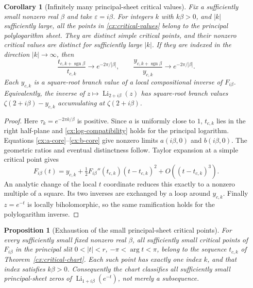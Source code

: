 \documentclass[11pt,a4paper]{article}
\numberwithin{equation}{section}
\newtheorem{proposition}[theorem]{Proposition}
\newtheorem{corollary}[theorem]{Corollary}
\theoremstyle{definition}
\theoremstyle{remark}
\DeclareMathOperator{\Li}{Li}
\begin{document}
\begin{corollary}[Infinitely many principal-sheet critical values]
\label{cx:critical-lattice}
Fix a sufficiently small nonzero real $\beta$ and take
$\varepsilon=i\beta$.  For integers $k$ with $k\beta>0$, and
$|k|$ sufficiently large, all the points in
\eqref{cx:critical-values} belong to the principal polylogarithm sheet.
They are distinct simple critical points, and their nonzero critical
values are distinct for sufficiently large $|k|$.  If they are indexed in
the direction $|k|\to\infty$, then
\begin{equation}\label{cx:geometric-ratio}
 \frac{t_{c,k+\operatorname{sgn}\beta}}{t_{c,k}}
   \longrightarrow e^{-2\pi/|\beta|},\qquad
 \frac{y_{c,k+\operatorname{sgn}\beta}}{y_{c,k}}
   \longrightarrow e^{-2\pi/|\beta|}.
\end{equation}
Each $y_{c,k}$ is a square-root branch value of a local compositional
inverse of $F_{i\beta}$.  Equivalently, the inverse of
$z\mapsto\Li_{2+i\beta}(z)$ has square-root branch values
$\zeta(2+i\beta)-y_{c,k}$ accumulating at $\zeta(2+i\beta)$.
\end{corollary}
\begin{proof}
Here $\tau_k=e^{-2\pi k/\beta}$ is positive.  Since $a$ is uniformly
close to $1$, $t_{c,k}$ lies in the right half-plane and
\eqref{cx:log-compatibility} holds for the principal logarithm.
Equations \eqref{cx:a-core}--\eqref{cx:b-core} give nonzero limits
$a(i\beta,0)$ and $b(i\beta,0)$.  The geometric ratios and eventual
distinctness follow.  Taylor expansion at a simple critical point gives
\[
 F_{i\beta}(t)=y_{c,k}
       +\tfrac12 F_{i\beta}''(t_{c,k})(t-t_{c,k})^2
       +O((t-t_{c,k})^3).
\]
An analytic change of the local $t$ coordinate reduces this exactly to a
nonzero multiple of a square.  Its two inverses are exchanged by a loop
around $y_{c,k}$.  Finally $z=e^{-t}$ is locally biholomorphic, so the same
ramification holds for the polylogarithm inverse.
\end{proof}

\begin{proposition}[Exhaustion of the small principal-sheet critical points]
\label{cx:critical-exhaustion}
For every sufficiently small fixed nonzero real $\beta$, all sufficiently
small critical points of $F_{i\beta}$ in the principal slit
$0<|t|<r$, $-\pi<\arg t<\pi$, belong to the sequence
$t_{c,k}$ of Theorem~\ref{cx:critical-chart}. Each such point has exactly
one index $k$, and that index satisfies $k\beta>0$.
Consequently the chart classifies all sufficiently small principal-sheet
zeros of $\Li_{1+i\beta}(e^{-t})$, not merely a subsequence.
\end{proposition}
\end{document}
